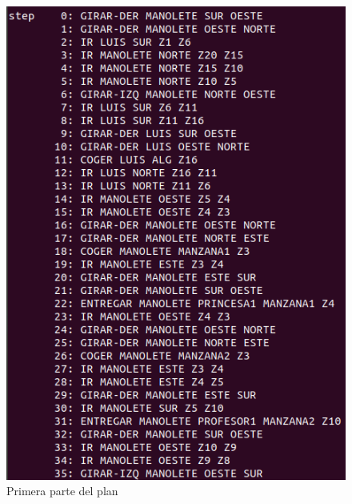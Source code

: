 \begin{figure}[H]
	\begin{minipage}[b]{0.5\linewidth}
		\centering
		\includegraphics[width=\linewidth]{ej6-1.png}
		\caption{Primera parte del plan}
		\label{fig:ej6-1}
	\end{minipage}
	\hspace{0.5cm}
	\begin{minipage}[b]{0.5\linewidth}
		\centering

\end{minipage}
\end{figure}
